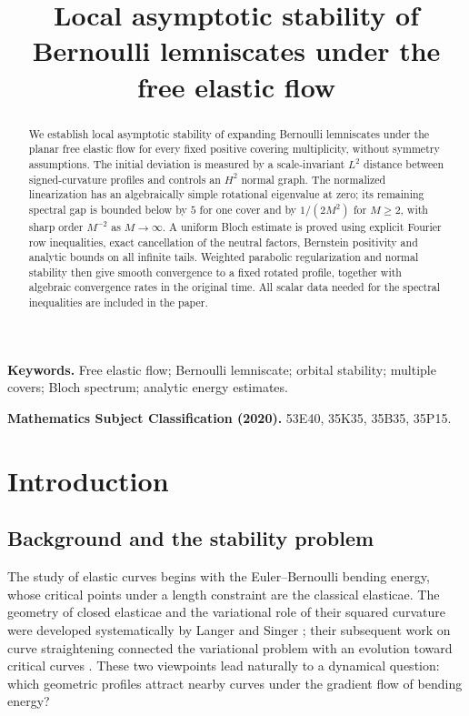 \documentclass[a4paper,11pt]{article}
\title{\bfseries Local asymptotic stability of Bernoulli lemniscates under the free elastic flow}
\author{}
\date{}
\numberwithin{equation}{section}
\theoremstyle{definition}
\theoremstyle{remark}
\begin{document}
\maketitle
\vspace{-15mm}
\begin{abstract}
We establish local asymptotic stability of expanding Bernoulli lemniscates under the planar free elastic flow for every fixed positive covering multiplicity, without symmetry assumptions. The initial deviation is measured by a scale-invariant $L^2$ distance between signed-curvature profiles and controls an $H^2$ normal graph. The normalized linearization has an algebraically simple rotational eigenvalue at zero; its remaining spectral gap is bounded below by $5$ for one cover and by $1/(2M^2)$ for $M\ge2$, with sharp order $M^{-2}$ as $M\to\infty$. A uniform Bloch estimate is proved using explicit Fourier row inequalities, exact cancellation of the neutral factors, Bernstein positivity and analytic bounds on all infinite tails. Weighted parabolic regularization and normal stability then give smooth convergence to a fixed rotated profile, together with algebraic convergence rates in the original time. All scalar data needed for the spectral inequalities are included in the paper.
\end{abstract}
\noindent\textbf{Keywords.} Free elastic flow; Bernoulli lemniscate; orbital stability; multiple covers; Bloch spectrum; analytic energy estimates.
\par\smallskip
\noindent\textbf{Mathematics Subject Classification (2020).} 53E40, 35K35, 35B35, 35P15.

\section{Introduction}\label{sec:intro}
\subsection{Background and the stability problem}
The study of elastic curves begins with the Euler--Bernoulli bending energy, whose critical points under a length constraint are the classical elasticae. The geometry of closed elasticae and the variational role of their squared curvature were developed systematically by Langer and Singer \cite{LS84}; their subsequent work on curve straightening connected the variational problem with an evolution toward critical curves \cite{LS85}. These two viewpoints lead naturally to a dynamical question: which geometric profiles attract nearby curves under the gradient flow of bending energy?
\end{document}
